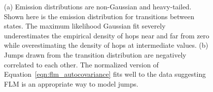 \documentclass{article}
\begin{document}
\begin{figure}
\begin{subfigure}{0.42\textwidth}
  \caption{}\label{fig:msddm_acf}
  \end{subfigure}
  \caption{(a) Emission distributions are non-Gaussian and heavy-tailed. Shown here is the
  emission distribution for transitions between states. The maximum likelihood
  Gaussian fit severely underestimates the empirical density of hops near and far from zero 
  while overestimating the density of hops at intermediate values. (b) Jumps drawn from
  the transition distribution are negatively correlated to each other. The normalized version 
  of Equation~\ref{eqn:flm_autocovariance} fits well to the data suggesting FLM is
  an appropriate way to model jumps.} \label{fig:msddm_emissions}
  \end{figure}
  
\end{document}
